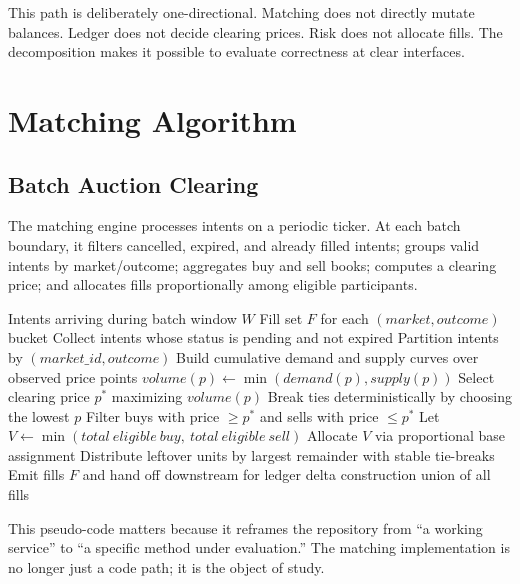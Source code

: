 \documentclass[11pt]{article}
\begin{document}
This path is deliberately one-directional. Matching does not directly mutate balances. Ledger does not decide clearing prices. Risk does not allocate fills. The decomposition makes it possible to evaluate correctness at clear interfaces.

\section{Matching Algorithm}

\subsection{Batch Auction Clearing}

The matching engine processes intents on a periodic ticker. At each batch boundary, it filters cancelled, expired, and already filled intents; groups valid intents by market/outcome; aggregates buy and sell books; computes a clearing price; and allocates fills proportionally among eligible participants.

\begin{algorithm}[ht]
\caption{Batch Auction Clearing and Settlement Preparation}
\label{alg:batch}
\begin{algorithmic}[1]
\Require Intents arriving during batch window $W$
\Ensure Fill set $F$ for each $(market, outcome)$ bucket
\State Collect intents whose status is pending and not expired
\State Partition intents by $(market\_id, outcome)$
  \State Build cumulative demand and supply curves over observed price points
    \State $volume(p) \gets \min(demand(p), supply(p))$
  \EndFor
  \State Select clearing price $p^\ast$ maximizing $volume(p)$
  \State Break ties deterministically by choosing the lowest $p$
  \State Filter buys with price $\ge p^\ast$ and sells with price $\le p^\ast$
  \State Let $V \gets \min(total\ eligible\ buy,\ total\ eligible\ sell)$
  \State Allocate $V$ via proportional base assignment
  \State Distribute leftover units by largest remainder with stable tie-breaks
  \State Emit fills $F$ and hand off downstream for ledger delta construction
\EndFor
\State \Return union of all fills
\end{algorithmic}
\end{algorithm}

This pseudo-code matters because it reframes the repository from ``a working service'' to ``a specific method under evaluation.'' The matching implementation is no longer just a code path; it is the object of study.
\end{document}
